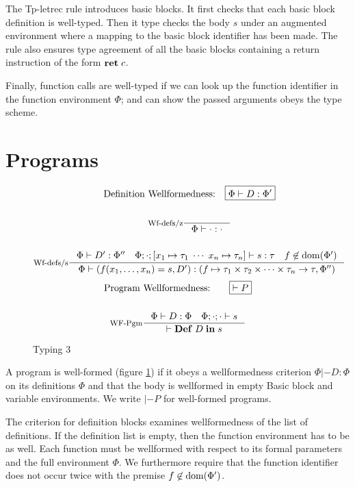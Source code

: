 \documentclass[a4paper, oneside, 10pt, draft]{memoir}
\begin{document}
The Tp-letrec rule introduces basic blocks. It first checks that each
basic block definition is well-typed. Then it type checks the body $s$
under an augmented environment where a mapping to the basic block
identifier has been made. The rule also ensures type agreement of all the basic
blocks containing a return instruction of the form $\mathbf{ret} \; c$.

Finally, function calls are well-typed if we can look up the function
identifier in the function environment $\Phi$; and can show the
passed arguments obeys the type scheme.

\section{Programs}
\begin{figure}
  \begin{gather*}
    \text{Definition Wellformedness:} \quad \boxed{\Phi |- D : \Phi'}\\\\
    \inference[Wf-defs/z]{}{\Phi |- \cdot : \cdot}\\\\
    \inference[Wf-defs/s]{\Phi |- D' : \Phi'' \quad \Phi;\cdot;[x_1 \mapsto
      \tau_1 \; \dotsb \; x_n \mapsto \tau_n] |- s :
      \tau \quad f \not \in \dom{\Phi'}}{\Phi |- (f(x_1, \dotsc, x_n) = s, D') : (f \mapsto \ntypes -> \tau, \Phi'')}
  \end{gather*}
  \begin{gather*}
    \text{Program Wellformedness:} \quad \quad \boxed{|- P}\\\\
    \inference[WF-Pgm]{\Phi |- D : \Phi \quad \Phi;\cdot;\cdot |- s}{|- \ipgm{D}{s}}
  \end{gather*}
  \caption{Typing 3}
  \label{fig:type-judgement-3}
\end{figure}

A program is well-formed (figure \ref{fig:type-judgement-3}) if it
obeys a wellformedness criterion $\boxed{\Phi |- D : \Phi}$ on its
definitions $\Phi$ and that the body is wellformed in empty Basic
block and variable environments. We write $\boxed{|- P}$ for
well-formed programs.

The criterion for definition blocks examines wellformedness of the
list of definitions. If the definition list is empty, then the
function environment has to be as well. Each function must be
wellformed with respect to its formal parameters and the full
environment $\Phi$. We furthermore require that the function identifier
does not occur twice with the premise $f \not \in \mathrm{dom}(\Phi')$.
\end{document}
